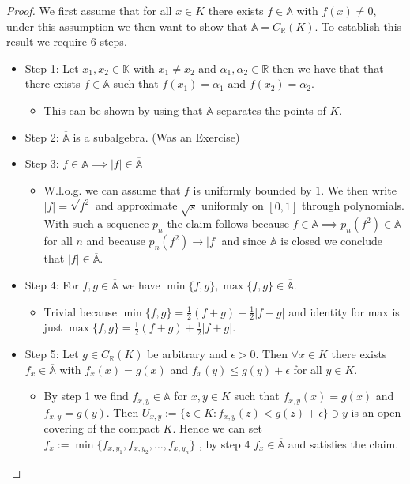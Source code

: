 \documentclass[11pt,a4paper]{article}
\theoremstyle{definition}
\begin{document}
\begin{proof}
We first assume that for all $x \in K$ there exists $f \in \mathbb{A}$ with $f(x) \neq 0$, under this assumption we then want to show that $\overline{\mathbb{A}} = C_\mathbb{R}(K)$. To establish this result we require 6 steps.


\begin{itemize}
\item Step 1: Let $x_1, x_2 \in \mathbb{K}$ with $x_1 \neq x_2$ and $\alpha_1, \alpha_2 \in \mathbb{R}$ then we have that that there exists $f \in \mathbb{A}$ such that $f(x_1)= \alpha_1$ and $f(x_2)= \alpha_2$. 
\begin{itemize}
\item This can be shown by using that $\mathbb{A}$ separates the points of $K$. 
\end{itemize}
\item Step 2: $\overline{\mathbb{A}}$ is a subalgebra. (Was an Exercise)
\item Step 3: $f \in \mathbb{A} \implies |f| \in \overline{\mathbb{A}}$
\begin{itemize}
\item W.l.o.g. we can assume that $f$ is uniformly bounded by $1$. We then write $|f| = \sqrt{f^2}$ and approximate $\sqrt{s}$ uniformly on $[0,1]$ through polynomials. With such a sequence $p_n$ the claim follows because $f \in \mathbb{A} \implies p_n(f^2)\in \mathbb{A}$ for all $n$ and because $p_n(f^2) \to |f|$ and since $\overline{\mathbb{A}}$ is closed we conclude that $|f| \in \overline{\mathbb{A}}$.
\end{itemize}
\item Step 4: For $f,g \in \overline{\mathbb{A}}$ we have $\min \{f,g\}, \max\{f,g\} \in \overline{\mathbb{A}}$. 
\begin{itemize}
\item Trivial because $\min \{f,g\} = \frac{1}{2}(f+g)- \frac{1}{2}| f-g|$ and identity for max is just $\max\{f,g\} = \frac{1}{2}(f+g)+\frac{1}{2}|f+g|$.
\end{itemize}
\item Step 5: Let $g \in C_\mathbb{R}(K)$ be arbitrary and $\epsilon >0$. Then $\forall x \in K$ there exists $f_x \in \overline{\mathbb{A}}$ with $f_x(x)=g(x)$ and $f_x(y) \leq g(y) + \epsilon$ for all $y \in K$. 
\begin{itemize}
\item By step 1 we find $f_{x,y} \in \mathbb{A}$ for $x,y \in K$ such that $f_{x,y}(x)=g(x)$ and $f_{x,y}=g(y)$. Then $U_{x,y}:= \lbrace z \in K : f_{x,y}(z)< g(z) + \epsilon \rbrace \ni y$ is an open covering of the compact $K$. Hence we can set $f_x:= \min \{f_{x,y_1}, f_{x,y_2}, \dots , f_{x,y_n} \}$ , by step 4 $f_x \in \overline{\mathbb{A}}$ and satisfies the claim. 

\end{itemize}
\end{itemize}
\end{proof}
\end{document}
